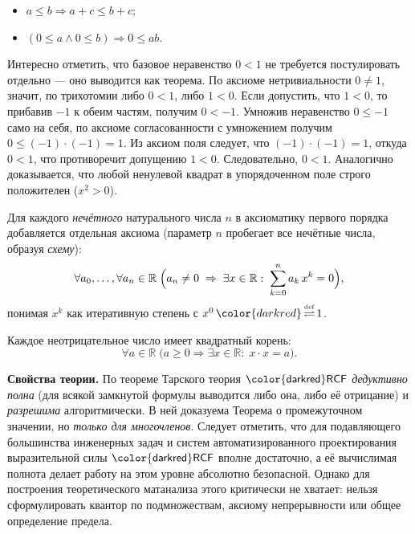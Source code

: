 \documentclass[11pt, a4paper]{extarticle}
\renewcommand{\eqdef}{\ifmmode{\,\color{darkred}\mathop{\overset{\text{\tiny def}}{\rightleftharpoons}}\,}\fi}%
\newcommand{\eqdef}{\,\mathop{\color{darkred}\overset{\text{\tiny def}}{\rightleftharpoons}}\,}
\newcommand{\R}{{\mathbb R}}
\renewcommand{\le}{\leqslant}
\renewcommand{\ge}{\geqslant}
\newcommand{\RCF}{\ifmmode \mathsf{\color{darkred}RCF}\else ${\mathsf{\color{darkred}RCF}}$\fi\xspace}
\begin{document}
\begin{axiom}\label{ax:ordered_field}
\begin{itemize}
    \item $a \le b \Rightarrow a + c \le b + c$;
    \item $(0 \le a \wedge 0 \le b) \Rightarrow 0 \le ab$.
\end{itemize}
\end{axiom}

\begin{remark}[Выводимость $0 < 1$]
    Интересно отметить, что базовое неравенство $0 < 1$ не требуется постулировать отдельно --- оно выводится как теорема. По аксиоме нетривиальности $0 \neq 1$, значит, по трихотомии либо $0 < 1$, либо $1 < 0$. Если допустить, что $1 < 0$, то прибавив $-1$ к обеим частям, получим $0 < -1$. Умножив неравенство $0 \le -1$ само на себя, по аксиоме согласованности с умножением получим $0 \le (-1)\cdot(-1) = 1$. Из аксиом поля следует, что $(-1)\cdot(-1) = 1$, откуда $0 < 1$, что противоречит допущению $1 < 0$. Следовательно, $0 < 1$. Аналогично доказывается, что любой ненулевой квадрат в упорядоченном поле строго положителен ($x^2 > 0$).
\end{remark}

\begin{axiom}\label{ax:rcf-odd-root}
    Для каждого \emph{нечётного} натурального числа $n$ в аксиоматику первого порядка добавляется отдельная аксиома (параметр $n$ пробегает все нечётные числа, образуя \emph{схему}):
    \[
    \forall a_0,\ldots,\forall a_n\in\R\;
    \Bigl(
    a_n \neq 0
    \;\Rightarrow\;
    \exists x\in\R:\;
    \sum_{k=0}^{n} a_k\, x^k = 0
    \Bigr),
    \]
    понимая $x^k$ как итеративную степень с $x^0\eqdef 1$.
\end{axiom}
    
\begin{axiom}\label{ax:square-root}
    Каждое неотрицательное число имеет квадратный корень:
    \[
    \forall a \in \R\; \bigl(a \ge 0 \Rightarrow \exists x \in \R:\; x \cdot x = a\bigr).
    \]
\end{axiom}

\smallskip\noindent\textbf{Свойства теории.} По теореме Тарского теория \RCF{} \emph{дедуктивно полна} (для всякой замкнутой формулы выводится либо она, либо её отрицание) и \emph{разрешима} алгоритмически. В ней доказуема Теорема о промежуточном значении, но \emph{только для многочленов}. 
Следует отметить, что для подавляющего большинства инженерных задач и систем автоматизированного проектирования выразительной силы \RCF{} вполне достаточно, а её вычислимая полнота делает работу на этом уровне абсолютно безопасной. Однако для построения теоретического матанализа этого критически не хватает: нельзя сформулировать квантор по подмножествам, аксиому непрерывности или общее определение предела.
\end{document}

